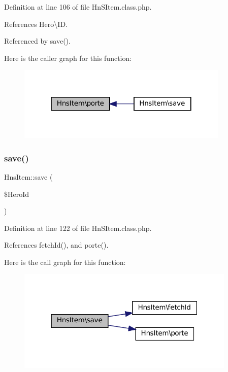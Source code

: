 Definition at line 106 of file Hn\+S\+Item.\+class.\+php.



References Hero\textbackslash{}\+ID.



Referenced by save().

Here is the caller graph for this function\+:\nopagebreak
\begin{figure}[H]
\begin{center}
\leavevmode
\includegraphics[width=286pt]{class_hns_item_a19379c2ae82def5cdf755944d8074493_icgraph}
\end{center}
\end{figure}
\mbox{\label{class_hns_item_a9f17e98c91bac235e4b0e73a7635daef}} 
\subsubsection{\texorpdfstring{save()}{save()}}
{\footnotesize\ttfamily Hns\+Item\+::save (\begin{DoxyParamCaption}\item[{}]{\$\+Hero\+Id }\end{DoxyParamCaption})}



Definition at line 122 of file Hn\+S\+Item.\+class.\+php.



References fetch\+Id(), and porte().

Here is the call graph for this function\+:\nopagebreak
\begin{figure}[H]
\begin{center}
\leavevmode
\includegraphics[width=295pt]{class_hns_item_a9f17e98c91bac235e4b0e73a7635daef_cgraph}
\end{center}
\end{figure}
\mbox{\label{class_hns_item_a20c4ab14e64c68fb03cf625ef1936417}} 
